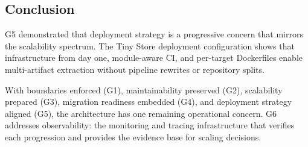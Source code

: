 \subsection*{Conclusion}

G5 demonstrated that deployment strategy is a progressive concern that mirrors the scalability spectrum. The Tiny Store deployment configuration shows that infrastructure from day one, module-aware CI, and per-target Dockerfiles enable multi-artifact extraction without pipeline rewrites or repository splits.

With boundaries enforced (G1), maintainability preserved (G2), scalability prepared (G3), migration readiness embedded (G4), and deployment strategy aligned (G5), the architecture has one remaining operational concern. G6 addresses observability: the monitoring and tracing infrastructure that verifies each progression and provides the evidence base for scaling decisions.

